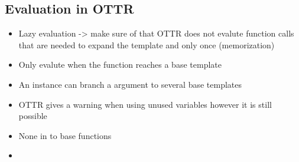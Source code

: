 \subsection{Evaluation in OTTR}
\begin{itemize}
    \item Lazy evaluation -> make sure of that OTTR does not evalute function calls that are needed to expand the template and only once (memorization)
    \item Only evalute when the function reaches a base template
    \item An instance can branch a argument to several base templates 
    \item OTTR gives a warning when using unused variables however it is still possible
    \item None in to base functions 
    \item 
\end{itemize}


